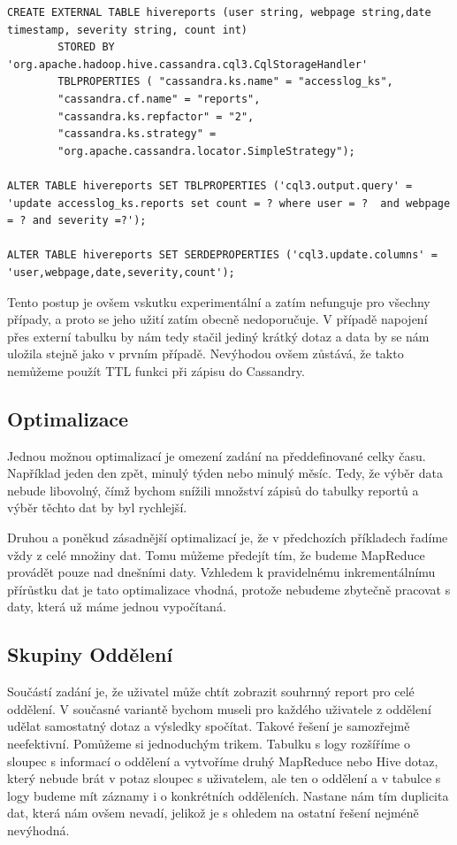 \begin{lstlisting}[caption={Vytvoření externí tabulky napojené na tabulku v CQL},label=Hive2]
CREATE EXTERNAL TABLE hivereports (user string, webpage string,date timestamp, severity string, count int)
        STORED BY 'org.apache.hadoop.hive.cassandra.cql3.CqlStorageHandler'
        TBLPROPERTIES ( "cassandra.ks.name" = "accesslog_ks",
        "cassandra.cf.name" = "reports",
        "cassandra.ks.repfactor" = "2",
        "cassandra.ks.strategy" =
        "org.apache.cassandra.locator.SimpleStrategy");
    
ALTER TABLE hivereports SET TBLPROPERTIES ('cql3.output.query' = 'update accesslog_ks.reports set count = ? where user = ?  and webpage = ? and severity =?');
    
ALTER TABLE hivereports SET SERDEPROPERTIES ('cql3.update.columns' = 'user,webpage,date,severity,count');
\end{lstlisting}

Tento postup je ovšem vskutku experimentální a zatím nefunguje pro všechny případy, a proto se jeho užití zatím obecně nedoporučuje. V případě napojení přes externí tabulku by nám tedy stačil jediný krátký dotaz a data by se nám uložila stejně jako v prvním případě. Nevýhodou ovšem zůstává, že takto nemůžeme použít TTL funkci při zápisu do Cassandry.

\subsection{Optimalizace}
Jednou možnou optimalizací je omezení zadání na předdefinované celky času. Například jeden den zpět, minulý týden nebo minulý měsíc. Tedy, že výběr data nebude libovolný, čímž bychom snížili množství zápisů do tabulky reportů a výběr těchto dat by byl rychlejší. 

Druhou a poněkud zásadnější optimalizací je, že v předchozích příkladech řadíme vždy z celé množiny dat. Tomu můžeme předejít tím, že budeme MapReduce provádět pouze nad dnešními daty. Vzhledem k pravidelnému inkrementálnímu přírůstku dat je tato optimalizace vhodná, protože nebudeme zbytečně pracovat s daty, která už máme jednou vypočítaná. 

\subsection{Skupiny Oddělení}
Součástí zadání je, že uživatel může chtít zobrazit souhrnný report pro celé oddělení. V současné variantě bychom museli pro každého uživatele z oddělení udělat samostatný dotaz a výsledky spočítat. Takové řešení je samozřejmě neefektivní. Pomůžeme si jednoduchým trikem. Tabulku s logy rozšíříme o sloupec s informací o oddělení a vytvoříme druhý MapReduce nebo Hive dotaz, který nebude brát v potaz sloupec s uživatelem, ale ten o oddělení a v tabulce s logy budeme mít záznamy i o konkrétních odděleních. Nastane nám tím duplicita dat, která nám ovšem nevadí, jelikož je s ohledem na ostatní řešení nejméně nevýhodná. 

